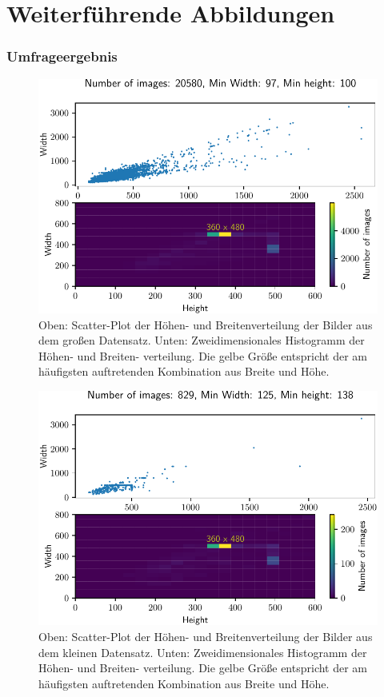 \FloatBarrier
\section{Weiterführende Abbildungen}
\subsubsection{Umfrageergebnis}
\begin{figure}
\centering
\includegraphics[width=\the\textwidth]{../../final_data/MiniNN_n120/width_heigt_scatter_hist2d.pdf}
\caption{Oben: Scatter-Plot der Höhen- und Breitenverteilung der Bilder aus dem
großen Datensatz. Unten: Zweidimensionales Histogramm der Höhen- und Breiten-
verteilung. Die gelbe Größe entspricht der am häufigsten auftretenden Kombination
aus Breite und Höhe.}
\label{fig:Bildverteilung_Datensatz}
\end{figure}
\begin{figure}
\centering
\includegraphics[width=\the\textwidth]{../../final_data/MiniNN_n5/width_heigt_scatter_hist2d.pdf}
\caption{Oben: Scatter-Plot der Höhen- und Breitenverteilung der Bilder aus dem
kleinen Datensatz. Unten: Zweidimensionales Histogramm der Höhen- und Breiten-
verteilung. Die gelbe Größe entspricht der am häufigsten auftretenden Kombination
aus Breite und Höhe.}
\label{fig:Bildverteilung_Datensatz_MiniDataset}
\end{figure}
\FloatBarrier
\FloatBarrier
